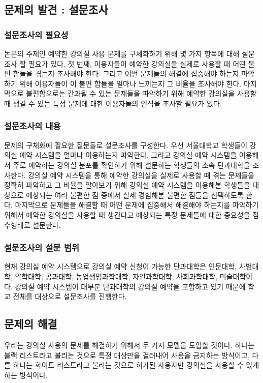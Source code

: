 \documentclass[11pt,a4paper]{article}
\begin{document}
\subsection{문제의 발견 : 설문조사}

\subsubsection{설문조사의 필요성}
논문의 주제인 예약한 강의실 사용 문제를 구체화하기 위해 몇 가지 항목에 대해 설문조사 할 필요가 있다.
첫 번째, 이용자들이 예약한 강의실을 실제로 사용할 때 어떤 불편 함들을 겪는지 조사해야 한다.
그리고 어떤 문제들의 해결에 집중해야 하는지 파악하기 위해 이용자들이 이 불편 함들을 얼마나 느끼는지 그 비율을 조사해야 한다.
마지막으로 불편함으로는 간과될 수 있는 문제들을 파악하기 위해 예약한 강의실을 사용할 때 생길 수 있는 특정 문제에 대한 이용자들의 인식을 조사할 필요가 있다.

\subsubsection{설문조사의 내용}
문제의 구체화에 필요한 질문들로 설문조사를 구성한다. 우선 서울대학교 학생들이 강의실 예약 시스템을 얼마나 이용하는지 파악한다. 그리고 강의실 예약 시스템을 이용해서 주로 예약하는 강의실 분포를 확인하기 위해 설문하는 학생들의 소속 단과대학을 조사한다.
강의실 예약 시스템을 통해 예약한 강의실을 실제로 사용할 때 겪는 문제들을 정확히 파악하고 그 비율을 알아보기 위해 강의실 예약 시스템을 이용해본 학생들을 대상으로 예상되는 여러 불편한 점 중에서 실제 경험해본 불편한 점들을 선택하도록 한다.
마지막으로 문제들을 해결할 때 어떤 문제에 집중해서 해결해야 하는지를 파악하기 위해서 예약한 강의실을 사용할 때 생긴다고 예상되는 특정 문제들에 대한 중요성을 점수형태로 설문한다.

\subsubsection{설문조사의 설문 범위}
현재 강의실 예약 시스템으로 강의실 예약 신청이 가능한 단과대학은 인문대학, 사범대학, 약학대학, 공과대학, 농업생명과학대학, 자연과학대학, 사회과학대학, 미술대학이다.
강의실 예약 시스템이 대부분 단과대학의 강의실 예약을 포함하고 있기 때문에 학교 전체를 대상으로 설문조사를 진행한다.

\subsection{문제의 해결}
우리는 강의실 사용의 문제를 해결하기 위해서 두 가지 모델을 도입할 것이다.
하나는 블랙 리스트라고 불리는 것으로 특정 대상만을 걸러내어 사용을 금지하는
방식이고, 다른 하나는 화이트 리스트라고 불리는 것으로 허가된 사용자만 강의실을
사용할 수 있게 하는 방식이다.
\end{document}
